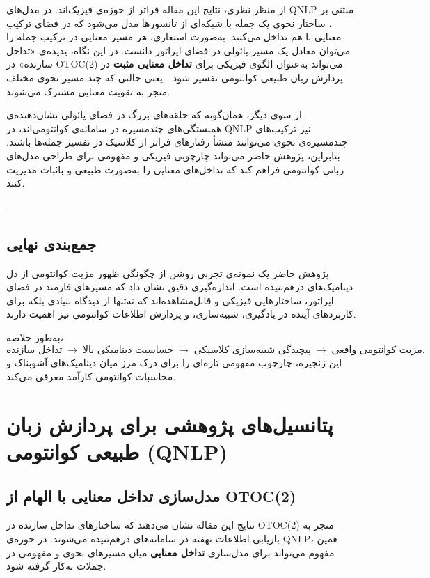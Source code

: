 از منظر نظری، نتایج این مقاله فراتر از حوزه‌ی فیزیک‌اند.  
در مدل‌های QNLP مبتنی بر ، ساختار نحوی یک جمله با شبکه‌ای از تانسورها مدل می‌شود که در فضای ترکیب معنایی با هم تداخل می‌کنند.  
به‌صورت استعاری، هر مسیر معنایی در ترکیب جمله را می‌توان معادل یک مسیر پائولی در فضای اپراتور دانست.  
در این نگاه، پدیده‌ی «تداخل سازنده» در OTOC(2) می‌تواند به‌عنوان الگوی فیزیکی برای \textbf{تداخل معنایی مثبت} در پردازش زبان طبیعی کوانتومی تفسیر شود—یعنی حالتی که چند مسیر نحوی مختلف منجر به تقویت معنایی مشترک می‌شوند.

از سوی دیگر، همان‌گونه که حلقه‌های بزرگ در فضای پائولی نشان‌دهنده‌ی همبستگی‌های چندمسیره در سامانه‌ی کوانتومی‌اند، در QNLP نیز ترکیب‌های چندمسیره‌ی نحوی می‌توانند منشأ رفتارهای فراتر از کلاسیک در تفسیر جمله‌ها باشند.  
بنابراین، پژوهش حاضر می‌تواند چارچوبی فیزیکی و مفهومی برای طراحی مدل‌های زبانی کوانتومی فراهم کند که تداخل‌های معنایی را به‌صورت طبیعی و باثبات مدیریت کنند.

---

\subsection{جمع‌بندی نهایی}

پژوهش حاضر یک نمونه‌ی تجربی روشن از چگونگی ظهور مزیت کوانتومی از دل دینامیک‌های درهم‌تنیده است.  
اندازه‌گیری دقیق  نشان داد که مسیرهای فازمند در فضای اپراتور، ساختارهایی فیزیکی و قابل‌مشاهده‌اند که نه‌تنها از دیدگاه بنیادی بلکه برای کاربردهای آینده در یادگیری، شبیه‌سازی، و پردازش اطلاعات کوانتومی نیز اهمیت دارند.

به‌طور خلاصه،  
\[
\text{تداخل سازنده} \;\longrightarrow\; \text{حساسیت دینامیکی بالا} \;\longrightarrow\; \text{پیچیدگی شبیه‌سازی کلاسیکی} \;\longrightarrow\; \text{مزیت کوانتومی واقعی.}
\]
این زنجیره، چارچوب مفهومی تازه‌ای را برای درک مرز میان دینامیک‌های آشوبناک و محاسبات کوانتومی کارآمد معرفی می‌کند.

\section{پتانسیل‌های پژوهشی برای پردازش زبان طبیعی کوانتومی (QNLP)}
\label{sec:qnlfuture}

\subsection{مدل‌سازی تداخل معنایی با الهام از OTOC(2)}

نتایج این مقاله نشان می‌دهند که ساختارهای تداخل سازنده در OTOC(2) منجر به بازیابی اطلاعات نهفته در سامانه‌های درهم‌تنیده می‌شوند.  
در حوزه‌ی QNLP، همین مفهوم می‌تواند برای مدل‌سازی \textbf{تداخل معنایی} میان مسیرهای نحوی و مفهومی در جملات به‌کار گرفته شود.

